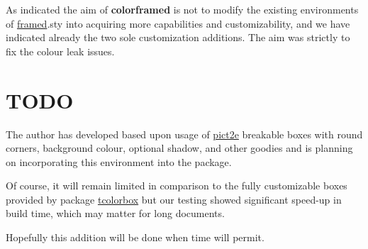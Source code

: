 \documentclass[a4paper,dvipdfmx,11pt]{article}
\def\ctanpackage#1{\href{https://ctan.org/pkg/#1}{#1}}
\newcommand\colorframed{%
        \texorpdfstring{{\color{joli}\bfseries colorframed}}{colorframed}\xspace}
\begin{document}
As indicated the aim of \colorframed is not to modify the
existing environments of \ctanpackage{framed}.sty into
acquiring more capabilities and customizability, and we have
indicated already the two sole customization additions. The aim
was strictly to fix the colour leak issues.

\section{TODO}

The author has developed based upon usage of
\ctanpackage{pict2e} breakable boxes with round corners,
background colour, optional shadow, and other goodies and is
planning on incorporating this environment into the package.

Of course, it will remain limited in comparison to the fully
customizable boxes provided by package \ctanpackage{tcolorbox}
but our testing showed significant speed-up in build time, which
may matter for long documents.

Hopefully this addition will be done when time will permit.
\end{document}
